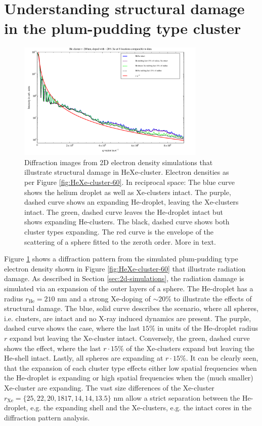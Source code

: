\section{Understanding structural damage in the plum-pudding type cluster}\label{sec:helium-xenon-data}
\begin{figure}
	\centering
		\includegraphics[width=0.80\textwidth]{images/results/simulations-damage-explain.pdf}
	\caption[Simulated structural damage scenarios in HeXe-clusters.]{Diffraction images from 2D electron density simulations that illustrate structural damage in HeXe-cluster. Electron densities as per Figure \ref{fig:HeXe-cluster-60}. In reciprocal space: The blue curve shows the helium droplet as well as Xe-clusters intact. The purple, dashed curve shows an expanding He-droplet, leaving the Xe-clusters intact. The green, dashed curve leaves the He-droplet intact but shows expanding He-clusters. The black, dashed curve shows both cluster types expanding. The red curve is the envelope of the scattering of a sphere fitted to the zeroth order. More in text.}
	\label{fig:simulations-damage-explain}
\end{figure}
Figure \ref{fig:simulations-damage-explain} shows a diffraction pattern from the simulated plum-pudding type electron density shown in Figure \ref{fig:HeXe-cluster-60} that illustrate radiation damage. As described in Section \ref{sec:2d-simulations}, the radiation damage is simulated via an expansion of the outer layers of a sphere. The He-droplet has a radius $r_{\text{He}}=210$ nm and a strong Xe-doping of $\sim 20 \%$ to illustrate the effects of structural damage. The blue, solid curve describes the scenario, where all spheres, i.e. clusters, are intact and no X-ray induced dynamics are present. The purple, dashed curve shows the case, where the last $15 \%$ in units of the He-droplet radius $r$ expand but leaving the Xe-cluster intact. Conversely, the green, dashed curve shows the effect, where the last $r\cdot 15 \%$ of the Xe-clusters expand but leaving the He-shell intact. Lastly, all spheres are expanding at $r\cdot 15 \%$. It can be clearly seen, that the expansion of each cluster type effects either low spatial frequencies when the He-droplet is expanding or high spatial frequencies when the (much smaller) Xe-cluster are expanding. The vast size differences of the Xe-cluster $r_{\text{Xe}}=\{25, 22, 20, 18 17, 14, 14, 13.5\}$ nm allow a strict separation between the He-droplet, e.g. the expanding shell and the Xe-clusters, e.g. the intact cores in the diffraction pattern analysis.\\
